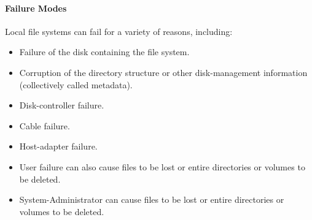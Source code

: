 \paragraph{Failure Modes}\label{par:Failure_Modes}
Local file systems can fail for a variety of reasons, including:
\begin{itemize}[noitemsep]
\item Failure of the disk containing the file system.
\item Corruption of the directory structure or other disk-management information (collectively called metadata).
\item Disk-controller failure.
\item Cable failure.
\item Host-adapter failure.
\item User failure can also cause files to be lost or entire directories or volumes to be deleted.
\item System-Administrator can cause files to be lost or entire directories or volumes to be deleted.
\end{itemize}


